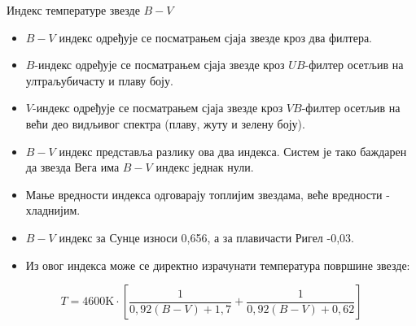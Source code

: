 \documentclass[aspectratio=169, xcolor=table, 10pt]{beamer}
\theoremstyle{definition}
\begin{document}
\begin{frame}{Индекс температуре звезде $B-V$}
  \begin{itemize}
    \item $B-V$ индекс одређује се посматрањем сјаја звезде кроз два филтера.
    \item $B$-индекс одређује се посматрањем сјаја звезде кроз $UB$-филтер осетљив на ултраљубичасту и плаву боју.
    \item $V$-индекс одређује се посматрањем сјаја звезде кроз $VB$-филтер осетљив на већи део видљивог спектра (плаву, жуту и зелену боју).
    \item $B-V$ индекс представља разлику ова два индекса. Систем је тако баждарен да звезда Вега има $B-V$ индекс једнак нули.
    \item Мање вредности индекса одговарају топлијим звездама, веће вредности - хладнијим.
    \item $B-V$ индекс за Сунце износи 0,656, а за плавичасти Ригел -0,03.
    \item Из овог индекса може се директно израчунати температура површине звезде:
  \end{itemize}
  \begin{equation*}
  T=4600\text{K}\cdot\left[\frac{1}{0,92(B-V)+1,7}+\frac{1}{0,92(B-V)+0,62}\right]
  \end{equation*}
\end{frame}
\end{document}

